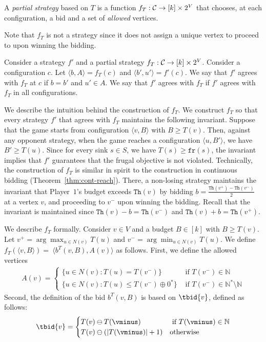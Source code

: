\documentclass{theoretics}
\newcommand{\PO}{Player~$1$\xspace}
\newcommand{\C}{{\cal C}}
\newcommand{\fr}{\texttt{fr}}
\newcommand{\Nat}{\mathbb{N}}
\newcommand{\Natstro}{\mathbb{N}^* \setminus \mathbb{N}}
\newcommand{\thresh}{\texttt{Th}\xspace}
\newcommand{\zug}[1]{\langle #1  \rangle}
\renewcommand{\set}[1]{\{ #1  \}}
\newcommand{\succb}[1]{#1 \oplus 0^*\xspace}
\newcommand{\absolut}[1]{|#1|}
\begin{document}
\begin{definition}
A {\em partial strategy} based on \(T\) is a function \(f_T: \C \rightarrow [k] \times 2^V\) that chooses, at each configuration, a bid and a set of {\em allowed} vertices. 
\end{definition}
Note that $f_T$ is not a strategy since it does not assign a unique vertex to proceed to upon winning the bidding. 
 
\begin{definition}
Consider a strategy \(f'\) and a partial strategy $f_T: \C \rightarrow [k] \times 2^V$. Consider a configuration $c$. Let \(\zug{b, A} = f_T(c)\) and \(\zug{b', u'} = f'(c)\). We say that $f'$ agrees with $f_T$ at $c$ if $b=b'$ and $u' \in A$. We say that $f'$ agrees with \(f_T\) if $f'$ agrees with $f_T$ in all configurations. 
\end{definition}

We describe the intuition behind the construction of $f_T$. We construct $f_T$ so that every strategy $f'$ that agrees with $f_T$ maintains the following invariant. 
Suppose that the game starts from configuration $\zug{v, B}$ with $B \geq T(v)$. Then, against any opponent strategy, when the game reaches a configuration $\zug{u, B'}$, we have $B' \geq T(u)$. Since for every sink $s \in S$, we have $T(s) \geq \fr(s)$, the invariant implies that $f'$ guarantees that the frugal objective is not violated. Technically, the construction of $f_T$ is similar in spirit to the construction in continuous bidding (Theorem~\ref{thm:cont-reach}). There, a non-losing strategy maintains the invariant that \PO's budget exceeds $\thresh(v)$ by bidding $b = \frac{\thresh(v^+) - \thresh(v^-)}{2}$ at a vertex $v$, and proceeding to $v^-$ upon winning the bidding. Recall that the invariant is maintained since $\thresh(v) - b = \thresh(v^-)$ and $\thresh(v) + b = \thresh(v^+)$. 

We describe $f_T$ formally. Consider $v \in V$ and a budget $B \in [k]$ with $B \geq T(v)$. Let $v^+ = \arg \max_{u \in N(v)} T(u)$ and $v^- = \arg \min_{u \in N(v)} T(u)$. We define $f_T(\zug{v, B}) =~\zug{b^T(v,B), A(v)}$ as follows.
First, we define the allowed vertices
\begin{align}
\label{eq: allowedvertices}
A(v) = \begin{cases}
\set{u \in N(v): T(u) = T(v^-)} & \text{ if } T(v^-) \in \Nat \\
\set{u \in N(v): T(u) \leq \succb{T(v^-)}} & \text{ if } T(v^-) \in \Natstro
\end{cases}
\end{align}
Second, the definition of the bid \(b^T(v,B)\) is based on \(\tbid{v}\), defined as follows: 
\begin{align}
	\label{eq: bids}
	\tbid{v} = 
	\begin{cases}
		T(v) \ominus T(\vminus) &\text{~if~} T(\vminus) \in \Nat\\
		T(v) \ominus (\absolut{T(\vminus)} + 1) &\text{otherwise}
	\end{cases}
\end{align}
\end{document}
